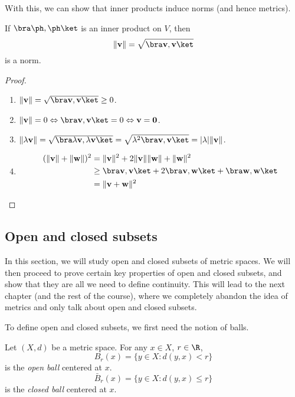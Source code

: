 \documentclass[a4paper]{article}
\begin{document}
With this, we can show that inner products induce norms (and hence metrics).
\begin{lemma}
  If $\bra \ph, \ph \ket$ is an inner product on $V$, then
  \[
    \|\mathbf{v}\| = \sqrt{\bra \mathbf{v}, \mathbf{v}\ket}
  \]
  is a norm.
\end{lemma}

\begin{proof}\leavevmode
  \begin{enumerate}
    \item $\|\mathbf{v}\| = \sqrt{\bra \mathbf{v}, \mathbf{v}\ket} \geq 0$.
    \item $\|\mathbf{v}\| = 0\Leftrightarrow \bra \mathbf{v}, \mathbf{v}\ket = 0 \Leftrightarrow \mathbf{v} = \mathbf{0}$.
    \item $\|\lambda \mathbf{v}\| = \sqrt{\bra \lambda \mathbf{v}, \lambda \mathbf{v}\ket} = \sqrt{\lambda^2 \bra \mathbf{v}, \mathbf{v}\ket} = |\lambda| \|\mathbf{v}\|$.
    \item
      \begin{align*}
        (\|\mathbf{v}\| + \|\mathbf{w}\|)^2 &= \|\mathbf{v}\|^2 + 2\|\mathbf{v}\|\|\mathbf{w}\| + \|\mathbf{w}\|^2\\
        &\geq \bra \mathbf{v}, \mathbf{v}\ket + 2\bra \mathbf{v}, \mathbf{w}\ket + \bra \mathbf{w}, \mathbf{w}\ket \\
        &= \|\mathbf{v} + \mathbf{w}\|^2
      \end{align*}
  \end{enumerate}
\end{proof}

\subsection{Open and closed subsets}
In this section, we will study open and closed subsets of metric spaces. We will then proceed to prove certain key properties of open and closed subsets, and show that they are all we need to define continuity. This will lead to the next chapter (and the rest of the course), where we completely abandon the idea of metrics and only talk about open and closed subsets.

To define open and closed subsets, we first need the notion of balls.
\begin{defi}
  Let $(X, d)$ be a metric space. For any $x\in X$, $r\in \R$,
  \[
    B_r(x) = \{y\in X: d(y, x) < r\}
  \]
  is the \emph{open ball} centered at $x$.
  \[
    \bar{B}_r(x) = \{y\in X: d(y, x) \leq r\}
  \]
  is the \emph{closed ball} centered at $x$.
\end{defi}
\end{document}
